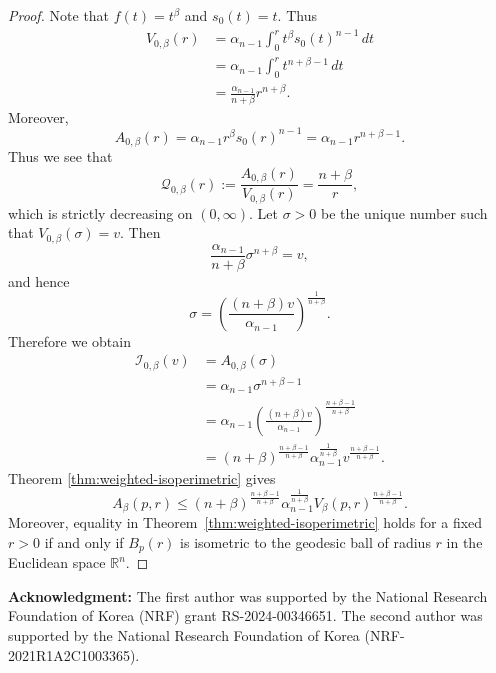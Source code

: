 \documentclass[11pt]{article}
\begin{document}
\begin{proof}
Note that $f(t)=t^\beta$ and $s_0(t)=t$. Thus
$$
\begin{aligned}
V_{0,\beta}(r)
&=
\alpha_{n-1}
\int_0^r t^\beta s_0(t)^{n-1}\,dt \\
&=
\alpha_{n-1}
\int_0^r t^{n+\beta-1}\,dt \\
&=
\frac{\alpha_{n-1}}{n+\beta}r^{n+\beta}.
\end{aligned}
$$
Moreover,
$$
A_{0,\beta}(r)
=
\alpha_{n-1}r^\beta s_0(r)^{n-1}
=
\alpha_{n-1}r^{n+\beta-1}.
$$
Thus we see that
$$
\mathcal{Q}_{0,\beta}(r)
:=
\frac{A_{0,\beta}(r)}{V_{0,\beta}(r)}
=
\frac{n+\beta}{r},
$$
which is strictly decreasing on $(0,\infty)$. Let $\sigma>0$ be the unique number such that $V_{0,\beta}(\sigma)=v$. Then
$$
\frac{\alpha_{n-1}}{n+\beta}\sigma^{n+\beta}=v,
$$
and hence
$$
\sigma
=
\left(
\frac{(n+\beta)v}{\alpha_{n-1}}
\right)^{\frac{1}{n+\beta}}.
$$
Therefore we obtain
$$
\begin{aligned}
\mathcal{I}_{0,\beta}(v)
&=
A_{0,\beta}(\sigma) \\
&=
\alpha_{n-1}\sigma^{n+\beta-1} \\
&=
\alpha_{n-1}
\left(
\frac{(n+\beta)v}{\alpha_{n-1}}
\right)^{\frac{n+\beta-1}{n+\beta}} \\
&=
(n+\beta)^{\frac{n+\beta-1}{n+\beta}}
\alpha_{n-1}^{\frac{1}{n+\beta}}
v^{\frac{n+\beta-1}{n+\beta}}.
\end{aligned}
$$
Theorem \ref{thm:weighted-isoperimetric} gives
$$
A_\beta(p,r)
\leq
(n+\beta)^{\frac{n+\beta-1}{n+\beta}}
\alpha_{n-1}^{\frac{1}{n+\beta}}
V_\beta(p,r)^{\frac{n+\beta-1}{n+\beta}}.
$$
Moreover, equality in Theorem~\ref{thm:weighted-isoperimetric} holds for a fixed $r>0$ if and only if $B_p(r)$ is isometric to the geodesic ball of radius $r$ in the Euclidean space $\mathbb{R}^n$.
\end{proof}












\vskip 0.3cm
\noindent
{\bf Acknowledgment: } The first author was supported by the National Research Foundation of Korea (NRF) grant RS-2024-00346651. The second author was supported by the National Research Foundation of Korea (NRF-2021R1A2C1003365).
\end{document}
